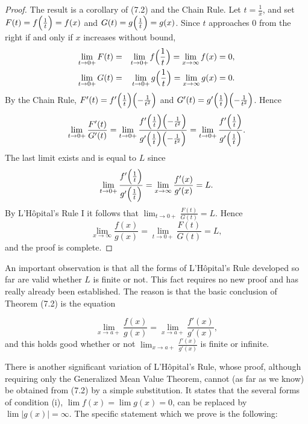 \begin{proof}
The result is a corollary of (7.2) and the Chain Rule. Let $t = \frac{1}{x}$, and set $F(t) = f \Bigl( \frac{1}{t} \Bigr) = f(x)$ and $G(t) = g \Bigl( \frac{1}{t} \Bigr) = g(x)$. Since $t$ approaches 0 from the right if and only if $x$ increases without bound,
\begin{eqnarray*}
\lim_{t \rightarrow 0+} F(t) &=& \lim_{t \rightarrow 0+} f \Bigl( \frac{1}{t} \Bigr) = \lim_{x \rightarrow
\infty} f(x) = 0,
\\ \lim_{t \rightarrow 0+} G(t) &=& \lim_{t \rightarrow 0+} g \Bigl( \frac{1}{t} \Bigr) = \lim_{x \rightarrow
\infty} g(x) = 0. 
\end{eqnarray*}
By the Chain Rule, $F'(t) = f' \Bigl( \frac{1}{t} \Bigr) \Bigl(-\frac{1}{t^2} \Bigr)$ and $G'(t) = g' \Bigl( \frac{1}{t} \Bigr) \Bigl( -\frac{1}{t^2} \Bigr)$.
\noindent Hence
$$
\lim_{t \rightarrow 0+} \frac{ F'(t)}{G'(t)} = \lim_{t \rightarrow 0+}
\frac{f'\Bigl( \frac{1}{t} \Bigr) \Bigl( -\frac{1}{t^2} \Bigr)}{g' \Bigl( \frac{1}{t} \Bigr)
\Bigl( -\frac{1}{t^2} \Bigr)} 
= \lim_{t \rightarrow 0+}\frac{f' \Bigl( \frac{1}{t} \Bigr)}{g' \Bigl( \frac{1}{t} \Bigr)}.
$$
The last limit exists and is equal to $L$ since 
$$
\lim_{t \rightarrow 0+}\frac{f' \Bigl( \frac{1}{t} \Bigr)}{g' \Bigl(\frac{1}{t} \Bigr)} 
= \lim_{x \rightarrow \infty} \frac{f'(x)}{g'(x)} = L.
$$
By L'H\^{o}pital's Rule I it follows that $\lim_{t \rightarrow 0+} \frac{F(t)}{G(t)} = L$. Hence 
$$
\lim_{x \rightarrow \infty} \frac{f(x)}{g(x)} = \lim_{t \rightarrow 0+} \frac{F(t)}{G(t)} = L,
$$
\noindent and the proof is complete.
\end{proof}

An important observation is that all the forms of L'H\^{o}pital's Rule developed so far are valid whether $L$ is finite or not. This fact requires no new proof and has really already been established. The reason is that the basic conclusion of Theorem (7.2) is the equation

$$
\lim_{x \rightarrow a+}\frac{f(x)}{g(x)} = \lim_{x \rightarrow a+}\frac{f'(x)}{g'(x)},
$$
\noindent and this holds good whether or not $\lim_{x \rightarrow a+}\frac{f'(x)}{g'(x)}$ is finite or infinite.
\smallskip

There is another significant variation of L'H\^{o}pital's Rule, whose proof, although requiring only the Generalized Mean Value Theorem, cannot (as far as we know) be obtained from (7.2) by a simple substitution. It states that the several forms of condition (i), $\lim f(x) = \lim g(x)= 0$, can be replaced by $\lim |g(x)| = \infty$. The specific statement which we prove is the following:

